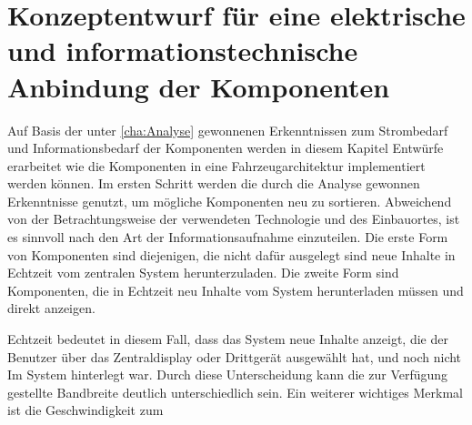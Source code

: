 \chapter{Konzeptentwurf für eine elektrische und informationstechnische Anbindung der Komponenten} \label{cha:Konzeptentwurf}
Auf Basis der unter \ref{cha:Analyse} gewonnenen Erkenntnissen zum Strombedarf und Informationsbedarf der Komponenten werden in diesem Kapitel Entwürfe erarbeitet wie die Komponenten in eine Fahrzeugarchitektur implementiert werden können.
Im ersten Schritt werden die durch die Analyse gewonnen Erkenntnisse genutzt, um mögliche Komponenten neu zu sortieren.
Abweichend von der Betrachtungsweise der verwendeten Technologie und des Einbauortes, ist es sinnvoll nach den Art der Informationsaufnahme einzuteilen. 
Die erste Form von Komponenten sind diejenigen, die nicht dafür ausgelegt sind neue Inhalte in Echtzeit vom zentralen System herunterzuladen.
Die zweite Form sind Komponenten, die in Echtzeit neu Inhalte vom System herunterladen müssen und direkt anzeigen.

Echtzeit bedeutet in diesem Fall, dass das System neue Inhalte anzeigt, die der Benutzer über das Zentraldisplay oder Drittgerät ausgewählt hat, und noch nicht Im System hinterlegt war.
Durch diese Unterscheidung kann die zur Verfügung gestellte Bandbreite deutlich unterschiedlich sein. 
Ein weiterer wichtiges Merkmal ist die Geschwindigkeit zum 